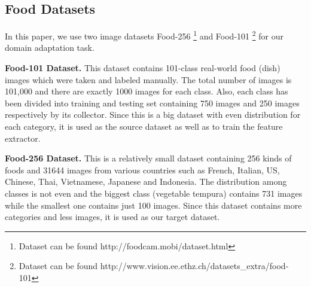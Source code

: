\subsection{Food Datasets}
 In this paper, we use two image datasets Food-256 \cite{kawano14c}\footnote{Dataset can be found http://foodcam.mobi/dataset.html} and Food-101 \cite{bossard14}\footnote{Dataset can be found http://www.vision.ee.ethz.ch/datasets\_extra/food-101} for our domain adaptation task. 

\textbf{Food-101 Dataset.}
This dataset contains 101-class real-world food (dish) images which were taken and labeled manually. The total number of images is 101,000 and there are exactly 1000 images for each class. Also, each class has been divided into training and testing set containing 750 images and 250 images respectively by its collector. Since this is a big dataset with even distribution for each category, it is used as the source dataset as well as to train the feature extractor.

\textbf{Food-256 Dataset.}
This is a relatively small dataset containing 256 kinds of foods and 31644 images from various countries such as French, Italian, US, Chinese, Thai, Vietnamese, Japanese and Indonesia. The distribution among classes is not even and the biggest class (vegetable tempura) contains 731 images while the smallest one contains just 100 images. Since this dataset contains more categories and less images, it is used as our target dataset.

